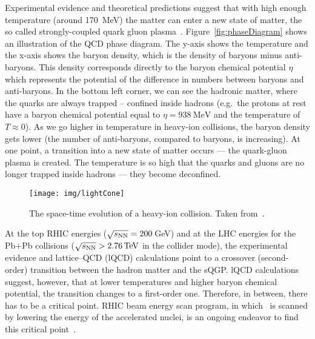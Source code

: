 Experimental evidence and theoretical predictions suggest that with high enough temperature (around \SI{170}{\mega\electronvolt}) the matter can enter a new state of matter, the so called strongly-coupled quark gluon plasma~\cite{QGPdiscovered}\@. Figure~\ref{fig:phaseDiagram} shows an illustration of the QCD phase diagram. The y-axis shows the temperature and the x-axis shows the baryon density, which is the density of baryons minus anti-baryons. This density corresponds directly to the baryon chemical potential $\eta$ which represents the potential of the difference in numbers between baryons and anti-baryons. In the bottom left corner, we can see the hadronic matter, where the quarks are always trapped -- confined inside hadrons (e.g.\ the protons at rest have a baryon chemical potential equal to $\eta = \SI{938}{\mega\electronvolt}$ and the temperature of $T \approx 0$). 
As we go higher in temperature in heavy-ion collisions, the baryon density gets lower (the number of anti-baryons, compared to baryons, is increasing). At one point, a transition into a new state of matter occurs --- the quark-gluon plasma is created. The temperature is so high that the quarks and gluons are no longer trapped inside hadrons --- they become deconfined. 

\begin{figure}[!htb]
\centering
\texttt{[image: img/lightCone]}
\caption{The space-time evolution of a heavy-ion collision. Taken from~\cite{helen}.}
\label{fig:lightCone}
\end{figure}

At the top RHIC energies ($\sqrt{s_\text{NN}} = 200\,$GeV) and at the LHC energies for the Pb+Pb collisions ($\snn > \SI{2.76}{\tera\electronvolt}$ in the collider mode), the experimental evidence and lattice--QCD (lQCD) calculations point to a crossover (second-order) transition between the hadron matter and the sQGP\@. lQCD calculations suggest, however, that at lower temperatures and higher baryon chemical potential, the transition changes to a first-order one. Therefore, in between, there has to be a critical point. RHIC beam energy scan program, in which \snn\ is scanned by lowering the energy of the accelerated nuclei, is an ongoing endeavor to find this critical point~\cite{BESII}. 


